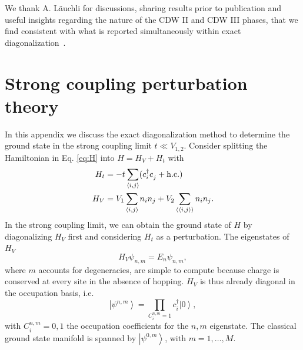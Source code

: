 \documentclass[aps,prx,10pt,twocolumn,floatfix,superscriptaddress,showpacs,numerical,footinbib]{revtex4-1}
\begin{document}
We thank A. L\"auchli for discussions, sharing results prior to publication
and useful insights regarding the nature of the CDW II and CDW III phases,
that we find consistent with what is reported simultaneously within exact diagonalization~\cite{Andreas}.

\appendix

\section{\label{sec:appendix} Strong coupling perturbation theory}

In this appendix we discuss the exact diagonalization method to determine the ground state in the strong coupling limit $t \ll V_{1,2}$. 
%
Consider splitting the Hamiltonian in Eq. \eqref{eq:H} into $H =H_V + H_t$ with
\begin{align}
%
 H_t &=-t\sum_{\left\langle i,j\right\rangle}(c^{\dagger}_{i}c^{\vphantom{\dagger}}_{j}+ \mathrm{h.c.}) \\
H_V &= V_{1}\sum_{\left\langle i,j\right\rangle }n_{i}n_{j}+
%
V_{2}\sum_{\left\langle \left\langle i,j\right\rangle \right\rangle }n_{i}n_{j}. 
%
\label{eq:Hsplit}
\end{align}
%
In the strong coupling limit, we can obtain the ground state of $H$ by diagonalizing $H_V$ first and considering $H_t$ as a perturbation. 
%
The eigenstates of $H_V$
\begin{equation}
H_V \psi_{n,m} = E_n \psi_{n,m},
\end{equation}
where $m$ accounts for degeneracies, are simple to compute because charge is conserved at every site in the absence of hopping. 
%
$H_V$ is thus already diagonal in the occupation basis, i.e.
\begin{equation}
\left| \psi^{n,m}\right> = \prod_{C^{n,m}_i = 1} c^\dagger_i \left|0\right>,
\end{equation}
%
 with $C^{n,m}_i=0,1$ the occupation coefficients for the $n,m$ eigenstate. 
The classical ground state manifold is spanned by $\left|\psi^{0,m}\right>$, with $m=1,\dots,M$.   
\end{document}
